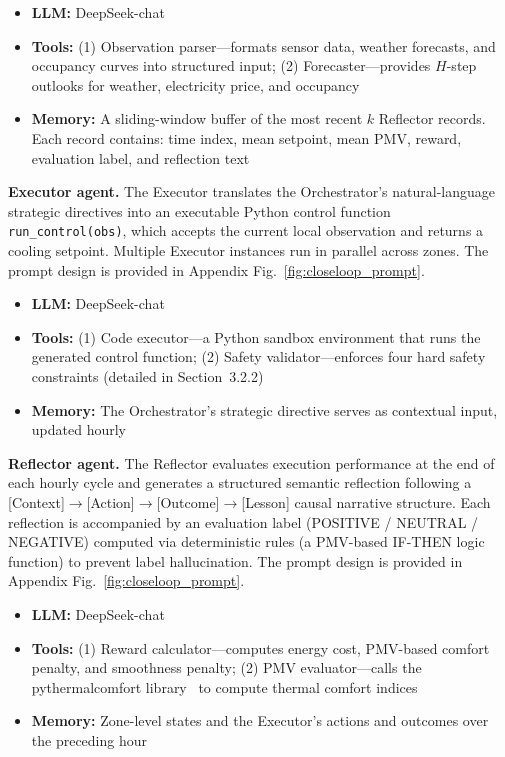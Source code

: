 \documentclass[a4paper]{cas-sc}
\begin{document}
\begin{itemize}
    \item \textbf{LLM:} DeepSeek-chat
    \item \textbf{Tools:} (1) Observation parser---formats sensor data, weather forecasts, and occupancy curves into structured input; (2) Forecaster---provides $H$-step outlooks for weather, electricity price, and occupancy
    \item \textbf{Memory:} A sliding-window buffer of the most recent $k$ Reflector records. Each record contains: time index, mean setpoint, mean PMV, reward, evaluation label, and reflection text
\end{itemize}

\textbf{Executor agent.}
The Executor translates the Orchestrator's natural-language strategic directives into an executable Python control function \texttt{run\_control(obs)}, which accepts the current local observation and returns a cooling setpoint. Multiple Executor instances run in parallel across zones. The prompt design is provided in Appendix Fig.~\ref{fig:closeloop_prompt}.

\begin{itemize}
    \item \textbf{LLM:} DeepSeek-chat
    \item \textbf{Tools:} (1) Code executor---a Python sandbox environment that runs the generated control function; (2) Safety validator---enforces four hard safety constraints (detailed in Section~3.2.2)
    \item \textbf{Memory:} The Orchestrator's strategic directive serves as contextual input, updated hourly
\end{itemize}

\textbf{Reflector agent.}
The Reflector evaluates execution performance at the end of each hourly cycle and generates a structured semantic reflection following a [Context]$\rightarrow$[Action]$\rightarrow$[Outcome]$\rightarrow$[Lesson] causal narrative structure. Each reflection is accompanied by an evaluation label (POSITIVE / NEUTRAL / NEGATIVE) computed via deterministic rules (a PMV-based IF-THEN logic function) to prevent label hallucination. The prompt design is provided in Appendix Fig.~\ref{fig:closeloop_prompt}.

\begin{itemize}
    \item \textbf{LLM:} DeepSeek-chat
    \item \textbf{Tools:} (1) Reward calculator---computes energy cost, PMV-based comfort penalty, and smoothness penalty; (2) PMV evaluator---calls the pythermalcomfort library~\cite{Tartarini2020-ox} to compute thermal comfort indices
    \item \textbf{Memory:} Zone-level states and the Executor's actions and outcomes over the preceding hour
\end{itemize}
\end{document}

